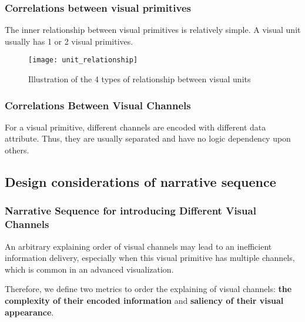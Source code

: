 \subsubsection{Correlations between visual primitives}
The inner relationship between visual primitives is relatively simple.
A visual unit usually has 1 or 2 visual primitives. 


\begin{figure}[tb]
 \centering %
 \texttt{[image: unit\_relationship]}
 \caption{Illustration of the 4 types of relationship between visual units}
 \label{fig:relationship}
\end{figure}

\subsubsection{Correlations Between Visual Channels}
For a visual primitive, different channels are encoded with different data attribute. Thus, they are usually separated and have no logic dependency upon others. 

\subsection{Design considerations of narrative sequence}


\subsubsection{Narrative Sequence for introducing Different Visual Channels}

An arbitrary explaining order of visual channels may lead to an inefficient information delivery, especially when this visual primitive has multiple channels, which is common in an advanced visualization. 

Therefore, we define two metrics to order the explaining of visual channels: \textbf{the complexity of their encoded information} and \textbf{saliency of their visual appearance}.

